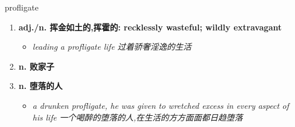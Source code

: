 
\begin{frame}
{\huge profligate}
\begin{center}
\begin{enumerate}\Large
  \item \textbf{adj./n. 挥金如土的,挥霍的: recklessly wasteful; wildly extravagant}
  \begin{itemize}
    \item \em{\Large{leading a profligate life 过着骄奢淫逸的生活}}
  \end{itemize}
  \item \textbf{n. 败家子}
  \item \textbf{n. 堕落的人}
  \begin{itemize}
    \item \em{\Large{a drunken profligate, he was given to wretched excess in every aspect of his life 一个喝醉的堕落的人,在生活的方方面面都日趋堕落}}
  \end{itemize}
\end{enumerate}
\end{center}
\end{frame}
